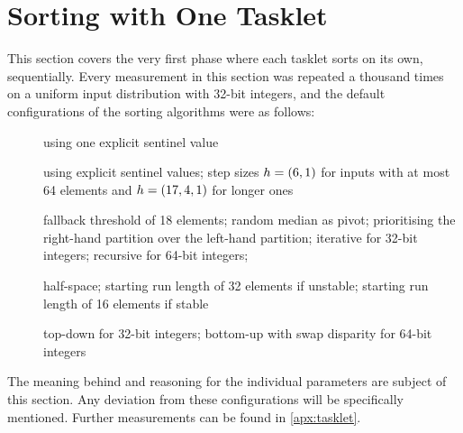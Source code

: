 \section{Sorting with One Tasklet}
\label{sec:tasklet}

This section covers the very first phase where each tasklet sorts on its own, \ie{} sequentially.
Every measurement in this section was repeated a thousand times on a uniform input distribution with 32-bit integers, and the default configurations of the sorting algorithms were as follows:
\begin{description}
	\item[\IS{}]
	using one explicit sentinel value

	\item[\ShS{}]
	using explicit sentinel values;
	step sizes \(h = (6, 1)\) for inputs with at most 64 elements and \(h = (17, 4, 1)\) for longer ones

	\item[\QS{}]
	fallback threshold of 18 elements;
	random median as pivot;
	prioritising the right-hand partition over the left-hand partition;
	iterative for 32-bit integers;
	recursive for 64-bit integers;

	\item[\MS{}]
	half-space;
	starting run length of 32 elements if unstable;
	starting run length of 16 elements if stable

	\item[\HS{}]
	top-down for 32-bit integers;
	bottom-up with swap disparity for 64-bit integers
\end{description}
The meaning behind and reasoning for the individual parameters are subject of this section.
Any deviation from these configurations will be specifically mentioned.
Further measurements can be found in \cref{apx:tasklet}.







